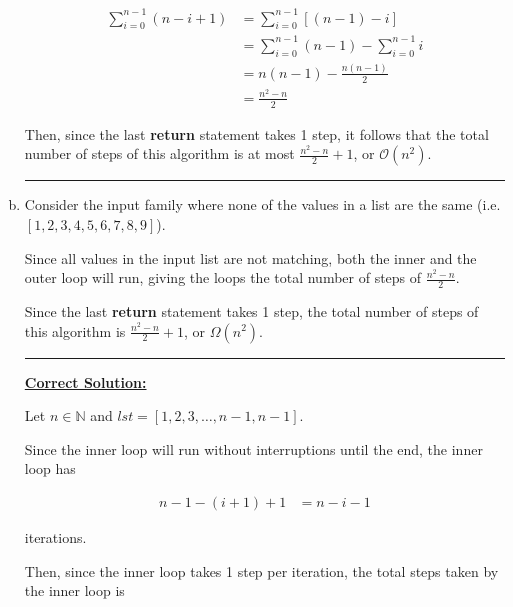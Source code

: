 \documentclass[12pt]{article}
\begin{document}
\begin{enumerate}[a.]
    \begin{align}
        \sum\limits_{i=0}^{n-1} (n - i + 1) &= \sum\limits_{i=0}^{n-1} \left[ (n-1) - i \right]\\
        &= \sum\limits_{i=0}^{n-1} (n-1) - \sum\limits_{i=0}^{n-1} i\\
        &= n(n-1) - \frac{n(n-1)}{2}\\
        &= \frac{n^2-n}{2}
    \end{align}

    \bigskip

    Then, since the last \textbf{return} statement takes 1 step, it follows
    that the total number of steps of this algorithm is at most
    $\frac{n^2-n}{2} + 1$, or $\mathcal{O}(n^2)$.
    \noindent\rule{\textwidth}{1pt}

    \item

    Consider the input family where none of the values in a list are the same
    (i.e. $[1,2,3,4,5,6,7,8,9]$).

    \bigskip

    Since all values in the input list are not matching, both the inner and
    the outer loop will run, giving the loops the total number of steps
    of $\frac{n^2-n}{2}$.

    \bigskip

    Since the last \textbf{return} statement takes 1 step, the total number of
    steps of this algorithm is $\frac{n^2-n}{2} + 1$, or $\Omega(n^2)$.

    \noindent\rule{\textwidth}{1pt}

    \bigskip

    \underline{\textbf{Correct Solution:}}

    \bigskip

    Let $n \in \mathbb{N}$ and $lst = [1,2,3,\dots,n-1,n-1]$.

    \bigskip

    Since the inner loop will run without interruptions until the end, the
    inner loop has

    \setcounter{equation}{0}
    \begin{align}
        n-1-(i+1) + 1 &= n-i-1
    \end{align}

    iterations.

    \bigskip

    Then, since the inner loop takes 1 step per iteration, the total steps
    taken by the inner loop is


\end{enumerate}
\end{document}
